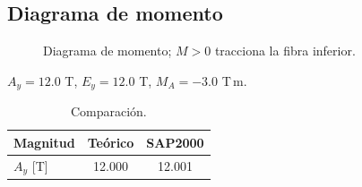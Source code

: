 \documentclass[letterpaper,10pt]{article}
\begin{document}
\subsection{Diagrama de momento}
\begin{figure}\centering
{}
\caption{Diagrama de momento; $M>0$ tracciona la fibra inferior.}
\end{figure}
\begin{resultado}
$A_y = 12.0$ T, $E_y = 12.0$ T, $M_A = -3.0$ T\,m.
\end{resultado}
\begin{table}\centering\caption{Comparación.}
\begin{tabular}{lSS}\toprule Magnitud & {Teórico} & {SAP2000}\\\midrule $A_y$ [T] & 12.000 & 12.001\\\bottomrule\end{tabular}
\end{table}
\end{document}
